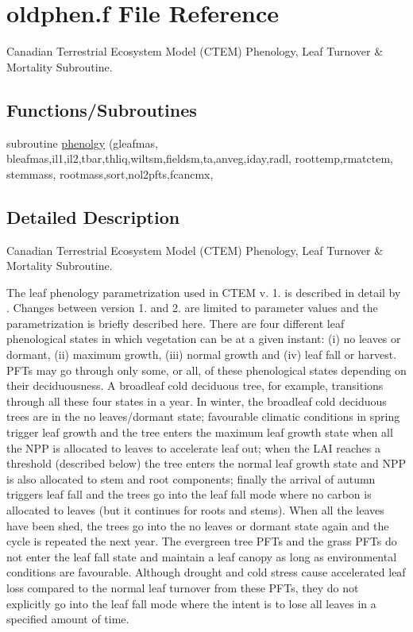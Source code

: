 \hypertarget{oldphen_8f}{}\section{oldphen.\+f File Reference}
\label{oldphen_8f}


Canadian Terrestrial Ecosystem Model (C\+T\+E\+M) Phenology, Leaf Turnover \& Mortality Subroutine.  


\subsection*{Functions/\+Subroutines}
\begin{DoxyCompactItemize}
\item 
subroutine \hyperlink{oldphen_8f_ad85527ae0852027749d2e1393c2a0ec9}{phenolgy} (gleafmas, bleafmas,il1,il2,tbar,thliq,wiltsm,fieldsm,ta,anveg,iday,radl, roottemp,rmatctem, stemmass, rootmass,sort,nol2pfts,fcancmx,
\end{DoxyCompactItemize}


\subsection{Detailed Description}
Canadian Terrestrial Ecosystem Model (C\+T\+E\+M) Phenology, Leaf Turnover \& Mortality Subroutine. 

The leaf phenology parametrization used in C\+T\+E\+M v. 1. is described in detail by \cite{Arora2005-6b1}. Changes between version 1. and 2. are limited to parameter values and the parametrization is briefly described here. There are four different leaf phenological states in which vegetation can be at a given instant\+: (i) no leaves or dormant, (ii) maximum growth, (iii) normal growth and (iv) leaf fall or harvest. P\+F\+Ts may go through only some, or all, of these phenological states depending on their deciduousness. A broadleaf cold deciduous tree, for example, transitions through all these four states in a year. In winter, the broadleaf cold deciduous trees are in the no leaves/dormant state; favourable climatic conditions in spring trigger leaf growth and the tree enters the maximum leaf growth state when all the N\+P\+P is allocated to leaves to accelerate leaf out; when the L\+A\+I reaches a threshold (described below) the tree enters the normal leaf growth state and N\+P\+P is also allocated to stem and root components; finally the arrival of autumn triggers leaf fall and the trees go into the leaf fall mode where no carbon is allocated to leaves (but it continues for roots and stems). When all the leaves have been shed, the trees go into the no leaves or dormant state again and the cycle is repeated the next year. The evergreen tree P\+F\+Ts and the grass P\+F\+Ts do not enter the leaf fall state and maintain a leaf canopy as long as environmental conditions are favourable. Although drought and cold stress cause accelerated leaf loss compared to the normal leaf turnover from these P\+F\+Ts, they do not explicitly go into the leaf fall mode where the intent is to lose all leaves in a specified amount of time.

